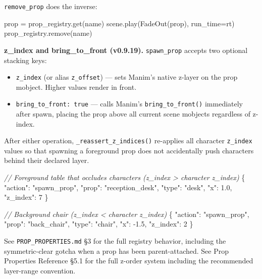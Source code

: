 \documentclass[
  11pt,
]{book}
\newenvironment{Shaded}{}{}
\newcommand{\CommentTok}[1]{\textcolor[rgb]{0.38,0.63,0.69}{\textit{#1}}}
\newcommand{\NormalTok}[1]{#1}
\newcommand{\OperatorTok}[1]{\textcolor[rgb]{0.40,0.40,0.40}{#1}}
\providecommand{\tightlist}{%
  \setlength{\itemsep}{0pt}\setlength{\parskip}{0pt}}
\begin{document}
\texttt{remove\_prop} does the inverse:

\begin{Shaded}
\begin{Highlighting}[]
\NormalTok{prop }\OperatorTok{=}\NormalTok{ prop\_registry.get(name)}
\NormalTok{scene.play(FadeOut(prop), run\_time}\OperatorTok{=}\NormalTok{rt)}
\NormalTok{prop\_registry.remove(name)}
\end{Highlighting}
\end{Shaded}

\textbf{z\_index and bring\_to\_front (v0.9.19).}
\texttt{spawn\_prop} accepts two optional stacking keys:

\begin{itemize}
\tightlist
\item
  \texttt{z\_index} (or alias \texttt{z\_offset}) --- sets Manim's
  native z-layer on the prop mobject. Higher values render in front.
\item
  \texttt{bring\_to\_front:\ true} --- calls Manim's
  \texttt{bring\_to\_front()} immediately after spawn, placing the prop
  above all current scene mobjects regardless of z-index.
\end{itemize}

After either operation, \texttt{\_reassert\_z\_indices()} re-applies all
character \texttt{z\_index} values so that spawning a foreground prop
does not accidentally push characters behind their declared layer.

\begin{Shaded}
\begin{Highlighting}[]
\CommentTok{// Foreground table that occludes characters (z\_index > character z\_index)}
\NormalTok{\{}
\NormalTok{  "action": "spawn\_prop",}
\NormalTok{  "prop": "reception\_desk",}
\NormalTok{  "type": "desk",}
\NormalTok{  "x": 1.0,}
\NormalTok{  "z\_index": 7}
\NormalTok{\}}

\CommentTok{// Background chair (z\_index < character z\_index)}
\NormalTok{\{}
\NormalTok{  "action": "spawn\_prop",}
\NormalTok{  "prop": "back\_chair",}
\NormalTok{  "type": "chair",}
\NormalTok{  "x": -1.5,}
\NormalTok{  "z\_index": 2}
\NormalTok{\}}
\end{Highlighting}
\end{Shaded}

See \texttt{PROP\_PROPERTIES.md} §3 for the full registry behavior,
including the symmetric-clear gotcha when a prop has been
parent-attached. See Prop Properties Reference §5.1 for the full
z-order system including the recommended layer-range convention.
\end{document}
